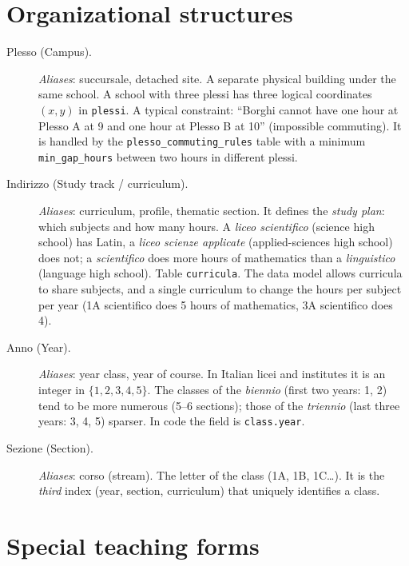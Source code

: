 \section{Organizational structures}

\begin{description}
\item[Plesso (Campus).]
  \emph{Aliases}: succursale, detached site. A separate physical
  building under the same school. A school with three plessi has
  three logical coordinates $(x,y)$ in \texttt{plessi}. A typical
  constraint: ``Borghi cannot have one hour at Plesso A at 9 and
  one hour at Plesso B at 10'' (impossible commuting). It is
  handled by the \texttt{plesso\_commuting\_rules} table with a
  minimum \texttt{min\_gap\_hours} between two hours in different
  plessi.

\item[Indirizzo (Study track / curriculum).]
  \emph{Aliases}: curriculum, profile, thematic section. It
  defines the \emph{study plan}: which subjects and how many
  hours. A \emph{liceo scientifico} (science high school) has
  Latin, a \emph{liceo scienze applicate} (applied-sciences high
  school) does not; a \emph{scientifico} does more hours of
  mathematics than a \emph{linguistico} (language high school).
  Table \texttt{curricula}. The data model allows curricula to
  share subjects, and a single curriculum to change the hours per
  subject per year (1A scientifico does 5 hours of mathematics, 3A
  scientifico does 4).

\item[Anno (Year).]
  \emph{Aliases}: year class, year of course. In Italian licei and
  institutes it is an integer in $\{1,2,3,4,5\}$. The classes of
  the \emph{biennio} (first two years: 1, 2) tend to be more
  numerous (5--6 sections); those of the \emph{triennio} (last
  three years: 3, 4, 5) sparser. In code the field is
  \texttt{class.year}.

\item[Sezione (Section).]
  \emph{Aliases}: corso (stream). The letter of the class (1A, 1B,
  1C\ldots). It is the \emph{third} index (year, section,
  curriculum) that uniquely identifies a class.
\end{description}

\section{Special teaching forms}

